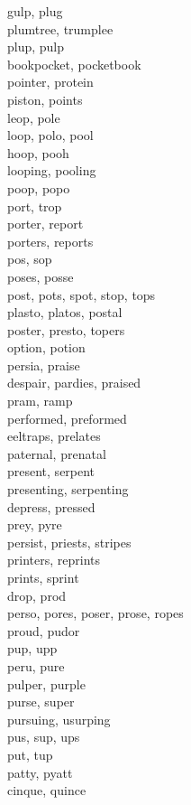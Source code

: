 gulp, plug\\
plumtree, trumplee\\
plup, pulp\\
bookpocket, pocketbook\\
pointer, protein\\
piston, points\\
leop, pole\\
loop, polo, pool\\
hoop, pooh\\
looping, pooling\\
poop, popo\\
port, trop\\
porter, report\\
porters, reports\\
pos, sop\\
poses, posse\\
post, pots, spot, stop, tops\\
plasto, platos, postal\\
poster, presto, topers\\
option, potion\\
persia, praise\\
despair, pardies, praised\\
pram, ramp\\
performed, preformed\\
eeltraps, prelates\\
paternal, prenatal\\
present, serpent\\
presenting, serpenting\\
depress, pressed\\
prey, pyre\\
persist, priests, stripes\\
printers, reprints\\
prints, sprint\\
drop, prod\\
perso, pores, poser, prose, ropes\\
proud, pudor\\
pup, upp\\
peru, pure\\
pulper, purple\\
purse, super\\
pursuing, usurping\\
pus, sup, ups\\
put, tup\\
patty, pyatt\\
cinque, quince\\
